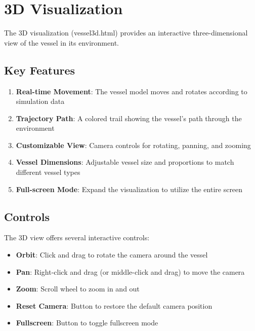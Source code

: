 \documentclass[
  letterpaper,
  DIV=11,
  numbers=noendperiod]{scrreprt}
\providecommand{\tightlist}{%
  \setlength{\itemsep}{0pt}\setlength{\parskip}{0pt}}\usepackage{longtable,booktabs,array}
\begin{document}
\section*{3D Visualization}\label{d-visualization}


The 3D visualization (vessel3d.html) provides an interactive
three-dimensional view of the vessel in its environment.

\subsection*{Key Features}\label{key-features-2}

\begin{enumerate}
\def\labelenumi{\arabic{enumi}.}
\tightlist
\item
  \textbf{Real-time Movement}: The vessel model moves and rotates
  according to simulation data
\item
  \textbf{Trajectory Path}: A colored trail showing the vessel's path
  through the environment
\item
  \textbf{Customizable View}: Camera controls for rotating, panning, and
  zooming
\item
  \textbf{Vessel Dimensions}: Adjustable vessel size and proportions to
  match different vessel types
\item
  \textbf{Full-screen Mode}: Expand the visualization to utilize the
  entire screen
\end{enumerate}

\subsection*{Controls}\label{controls}

The 3D view offers several interactive controls:

\begin{itemize}
\tightlist
\item
  \textbf{Orbit}: Click and drag to rotate the camera around the vessel
\item
  \textbf{Pan}: Right-click and drag (or middle-click and drag) to move
  the camera
\item
  \textbf{Zoom}: Scroll wheel to zoom in and out
\item
  \textbf{Reset Camera}: Button to restore the default camera position
\item
  \textbf{Fullscreen}: Button to toggle fullscreen mode
\end{itemize}
\end{document}
